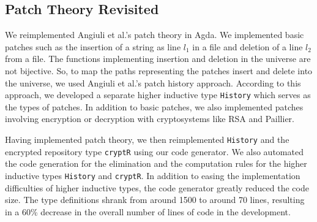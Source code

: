\documentclass[runningheads]{llncs}
\begin{document}

\subsection{Patch Theory Revisited}
\label{patch-theory}


We reimplemented Angiuli et al.'s patch theory in Agda.
We implemented basic patches such as the insertion of a string as line $l_1$ in a file and deletion of a line $l_2$ from a file. The functions implementing insertion and deletion in the universe are not bijective. So, to map the paths representing the patches insert and delete into the universe, we used Angiuli et al.'s patch history approach. According to this approach, we developed a separate higher inductive type \texttt{History} which serves as the types of patches. In addition to basic patches, we also implemented patches involving encryption or decryption with cryptosystems like RSA and Paillier.

Having implemented patch theory, we then reimplemented \texttt{History} and the encrypted repository type \texttt{cryptR} using our code generator. We also automated the code generation for the elimination and the computation rules for the higher inductive types \texttt{History} and \texttt{cryptR}. In addition to easing the implementation difficulties of higher inductive types, the code generator greatly reduced the code size. The type definitions shrank from around 1500 to around 70 lines, resulting in a 60\% decrease in the overall number of lines of code in the development.
\end{document}

